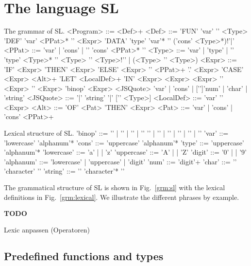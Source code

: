 \documentclass{article}
\newcommand{\TODO}{\begin{center}\LARGE\textbf{TODO}\end{center}}
\begin{document}
\section{The language SL}

\renewcommand{\arraystretch}{1.2}

\begin{grammarfigure}[grm:sl]{The grammar of SL.}
  <Program> ::= <Def>+
  <Def> ::= 'FUN' 'var' '\colon' <Type>
  \alt 'DEF' 'var' <PPat>* '\eq' <Expr>
  \alt 'DATA' 'type' 'var'* '\eq' ('cons' <Type>*)!'\bar'
  <PPat> ::= 'var' | 'cons' | '\open' 'cons' <PPat>* '\close'
  <Type> ::= 'var' | 'type' | '\open' 'type' <Type>* '\close'
  \alt <Type> '\arrow' <Type>!'\arrow' | (<Type> '\arrow' <Type>)
  <Expr> ::= 'IF' <Expr> 'THEN' <Expr> 'ELSE' <Expr>
  \alt '\lam' <PPat>+ '.' <Expr>
  \alt 'CASE' <Expr> <Alt>+
  \alt 'LET' <LocalDef>+ 'IN' <Expr>
  \alt <Expr> <Expr>
  \alt '\open' <Expr> '\close'
  \alt <Expr> 'binop' <Expr>
  \alt <JSQuote>
  \alt 'var' | 'cons' | ['\subint']'num' | 'char' | 'string'
  <JSQuote> ::= '\bropen\bar' 'string' '\bar\brclose' ['\colon' <Type>]
  <LocalDef> ::= 'var' '\eq' <Expr>
  <Alt> ::= 'OF' <Pat> 'THEN' <Expr>
  <Pat> ::= 'var' | 'cons' | 'cons' <PPat>+
\end{grammarfigure}


\begin{grammarfigure}{Lexical structure of SL.}
  'binop' ::= '\addint' | '\subint' | '\mulint' | '\divint'
  \alt '\ltint' | '\leint' | '\eqint' | '\neint' | '\geint' | '\gtint'
  'var' ::= 'lowercase' 'alphanum'*
  'cons' ::= 'uppercase' 'alphanum'*
  'type' ::= 'uppercase' 'alphanum'*
  'lowercase' ::= 'a' | \cdots | 'z'
  'uppercase' ::= 'A' | \cdots | 'Z'
  'digit' ::= '0' | \cdots | '9'
  'alphanum' ::= 'lowercase' | 'uppercase' | 'digit'
  'num' ::= 'digit'+
  'char' ::= '\squote' 'character' '\squote'
  'string' ::= '\dquote' 'character'* '\dquote'
\end{grammarfigure}


The grammatical structure of SL is shown in Fig.~\ref{grm:sl} with the
lexical definitions in Fig.~\ref{grm:lexical}. We illustrate the
different phrases by example.

\TODO{Lexic anpassen (Operatoren)}


\subsection{Predefined functions and types}
\label{sec:pred-funct-types}
\end{document}
